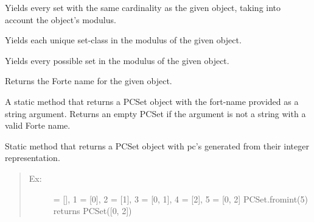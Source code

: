 \documentclass[letterpaper,10pt,english]{sphinxmanual}
\begin{document}
\begin{fulllineitems}

\begin{fulllineitems}
\label{_templates/core:core.PPCSetBase.each_card}
Yields every set with the same cardinality as the given object, taking
into account the object's modulus.

\end{fulllineitems}


\begin{fulllineitems}
\label{_templates/core:core.PPCSetBase.each_prime}
Yields each unique set-class in the modulus of the given object.

\end{fulllineitems}


\begin{fulllineitems}
\label{_templates/core:core.PPCSetBase.each_set}
Yields every possible set in the modulus of the given object.

\end{fulllineitems}


\begin{fulllineitems}
\label{_templates/core:core.PPCSetBase.forte}
Returns the Forte name for the given object.

\end{fulllineitems}


\begin{fulllineitems}
\label{_templates/core:core.PPCSetBase.forte_name}
A static method that returns a PCSet object with the fort-name provided
as a string argument.
Returns an empty PCSet if the argument is not a string with a valid
Forte name.

\end{fulllineitems}


\begin{fulllineitems}
\label{_templates/core:core.PPCSetBase.fromint}
Static method that returns a PCSet object with pc's generated from
their integer representation.
\begin{quote}
\begin{description}
\item[{Ex:}]  = {[}{]}, 1 = {[}0{]}, 2 = {[}1{]}, 3 = {[}0, 1{]}, 4 = {[}2{]}, 5 = {[}0, 2{]}
PCSet.fromint(5) returns PCSet({[}0, 2{]})


\end{description}
\end{quote}
\end{fulllineitems}
\end{fulllineitems}
\end{document}
